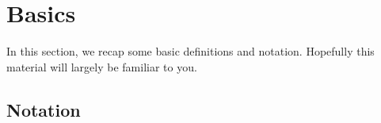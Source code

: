 \documentclass[]{book}
\theoremstyle{definition}
\theoremstyle{definition}
\theoremstyle{definition}
\theoremstyle{remark}
\begin{document}
\renewcommand{\bY}{\boldsymbol Y}
\renewcommand{\bx}{\boldsymbol x}
\renewcommand{\bX}{\boldsymbol X}
\renewcommand{\bH}{\boldsymbol H}
\renewcommand{\by}{\boldsymbol y}
\renewcommand{\bz}{\boldsymbol z}
\renewcommand{\bS}{\boldsymbol S}
\renewcommand{\bR}{\boldsymbol R}
\renewcommand{\bmu}{\boldsymbol \mu}
\renewcommand{\bSigma}{\boldsymbol \Sigma}
\renewcommand{\bLambda}{\boldsymbol \Lambda}
\renewcommand{\bgamma}{\boldsymbol \gamma}
\renewcommand{\blambda}{\boldsymbol \lambda}
\renewcommand{\bA}{\boldsymbol A}
\renewcommand{\bB}{\boldsymbol B}
\renewcommand{\bD}{\boldsymbol D}
\renewcommand{\bC}{\boldsymbol C}
\renewcommand{\bR}{\boldsymbol R}
\renewcommand{\bM}{\boldsymbol M}
\renewcommand{\bP}{\boldsymbol P}
\renewcommand{\bQ}{\boldsymbol Q}
\renewcommand{\bT}{\boldsymbol T}
\renewcommand{\bW}{\boldsymbol W}
\renewcommand{\ba}{\boldsymbol a}
\renewcommand{\bb}{\boldsymbol b}
\renewcommand{\bc}{\boldsymbol c}
\renewcommand{\bd}{\boldsymbol d}
\renewcommand{\bh}{\boldsymbol h}
\renewcommand{\bp}{\boldsymbol p}
\renewcommand{\bq}{\boldsymbol q}
\renewcommand{\bu}{\boldsymbol u}
\renewcommand{\bzero}{\boldsymbol 0}
\renewcommand{\mR}{\mathbb R}
\renewcommand{\cR}{\mathcal R}

\renewcommand{\bs}{\boldsymbol}
\renewcommand{\ds}{\displaystyle}
\renewcommand{\tdiag}{\text{diag}}
\renewcommand{\ttr}{\text{tr}}
\renewcommand{\tdet}{\text{det}}

\renewcommand{\tcov}{\text{cov}}
\renewcommand{\texp}{\text{exp}}
\renewcommand{\lb}{\left(}
\renewcommand{\rb}{\right)}
\renewcommand{\lsb}{\left[}
\renewcommand{\rsb}{\right]}

\hypertarget{linalg-basics}{%
\section{Basics}\label{linalg-basics}}

In this section, we recap some basic definitions and notation. Hopefully this material will largely be familiar to you.

\hypertarget{notation-1}{%
\subsection{Notation}\label{notation-1}}
\end{document}
